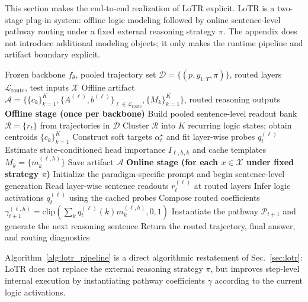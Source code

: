 This section makes the end-to-end realization of LoTR explicit. LoTR is a two-stage plug-in system: offline logic modeling followed by online sentence-level pathway routing under a fixed external reasoning strategy \(\pi\). The appendix does not introduce additional modeling objects; it only makes the runtime pipeline and artifact boundary explicit.

\begin{algorithm}[b]
\caption{LoTR: End-to-End Pipeline}
\label{alg:lotr_pipeline}
\begin{algorithmic}[1]
\REQUIRE Frozen backbone \(f_\theta\), pooled trajectory set \(\mathcal{D}=\{(p,y_{1:T},\pi)\}\), routed layers \(\mathcal{L}_{\mathrm{route}}\), test inputs \(\mathcal{X}\)
\ENSURE Offline artifact \(\mathcal{A}=\{\{c_k\}_{k=1}^K,\{A^{(\ell)},b^{(\ell)}\}_{\ell\in\mathcal{L}_{\mathrm{route}}},\{M_k\}_{k=1}^K\}\), routed reasoning outputs
\STATE \textbf{Offline stage (once per backbone)}
\STATE \quad Build pooled sentence-level readout bank \(\mathcal{R}=\{r_t\}\) from trajectories in \(\mathcal{D}\)
\STATE \quad Cluster \(\mathcal{R}\) into \(K\) recurring logic states; obtain centroids \(\{c_k\}_{k=1}^K\)
\STATE \quad Construct soft targets \(\alpha_t^\star\) and fit layer-wise probes \(q_t^{(\ell)}\)
\STATE \quad Estimate state-conditioned head importance \(I_{\ell,h,k}\) and cache templates \(M_k=\{m_k^{(\ell,h)}\}\)
\STATE \quad Save artifact \(\mathcal{A}\)
\STATE \textbf{Online stage (for each \(x\in\mathcal{X}\) under fixed strategy \(\pi\))}
\STATE \quad Initialize the paradigm-specific prompt and begin sentence-level generation
    \STATE Read layer-wise sentence readouts \(r_t^{(\ell)}\) at routed layers
    \STATE Infer logic activations \(q_t^{(\ell)}\) using the cached probes
    \STATE Compose routed coefficients \(\gamma_{t+1}^{(\ell,h)}=\mathrm{clip}\!\left(\sum_k q_t^{(\ell)}(k)m_k^{(\ell,h)},0,1\right)\)
    \STATE Instantiate the pathway \(\mathcal{P}_{t+1}\) and generate the next reasoning sentence
\ENDFOR
\STATE Return the routed trajectory, final answer, and routing diagnostics
\end{algorithmic}
\end{algorithm}

Algorithm~\ref{alg:lotr_pipeline} is a direct algorithmic restatement of Sec.~\ref{sec:lotr}: LoTR does not replace the external reasoning strategy \(\pi\), but improves step-level internal execution by instantiating pathway coefficients \(\gamma\) according to the current logic activations.

